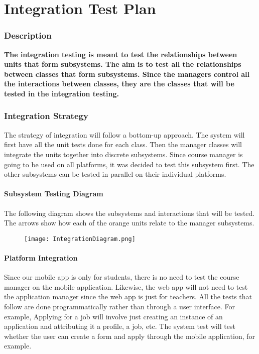 \documentclass[12pt]{report}
\begin{document}
\part{Integration Test Plan}
\section{Description}
\textbf{The integration testing is meant to test the relationships between units that form subsystems. The aim is to test all the relationships between classes that form subsystems. Since the managers control all the interactions between classes, they are the classes that will be tested in the integration testing.}
\section{Integration Strategy}

The strategy of integration will follow a bottom-up approach. The system will first have all the unit tests done for each class. Then the manager classes will integrate the units together into discrete subsystems. Since course manager is going to be used on all platforms, it was decided to test this subsystem first. The other subsystems can be tested in parallel on their individual platforms.
 \subsection{Subsystem Testing Diagram}
    The following diagram shows the subsystems and interactions that will be tested. The arrows show how each of the orange units relate to the manager subsystems. 
 \begin{figure}[H]
    \centering
    \texttt{[image: IntegrationDiagram.png]}
 \end{figure}
 \subsection{Platform Integration}
 
Since our mobile app is only for students, there is no need to test the course manager on the mobile application. Likewise, the web app will not need to test the application manager since the web app is just for teachers. All the tests that follow are done programmatically rather than through a user interface. For example, Applying for a job will involve just creating an instance of an application and attributing it a profile, a job, etc. The system test will test whether the user can create a form and apply through the mobile application, for example.
 
\end{document}
